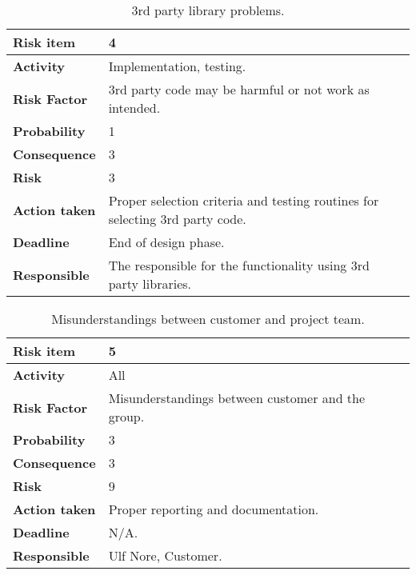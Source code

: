 \begin{table}[h!]
\begin{center}
\begin{tabularx}{\textwidth}{| X | X |}
\hline
\textbf{Risk item} & 4 \\
\hline
\textbf{Activity} & Implementation, testing.  \\
\hline
\textbf{Risk Factor} & 3rd party code may be harmful or not work as intended. \\
\hline
\textbf{Probability} & 1 \\
\hline
\textbf{Consequence} & 3 \\
\hline
\textbf{Risk} & 3 \\
\hline
\textbf{Action taken} & Proper selection criteria and testing routines for selecting 3rd party code. \\
\hline
\textbf{Deadline} & End of design phase. \\
\hline
\textbf{Responsible} & The responsible for the functionality using 3rd party libraries. \\
\hline
\end{tabularx}
\caption{3rd party library problems.}
\end{center}
\label{risk_7}
\end{table}


\begin{table}[h!]

\begin{center}
\begin{tabularx}{\textwidth}{| X | X |}
\hline
\textbf{Risk item} & 5 \\
\hline
\textbf{Activity} & All  \\
\hline
\textbf{Risk Factor} & Misunderstandings between customer and the group. \\
\hline
\textbf{Probability} & 3 \\
\hline
\textbf{Consequence} & 3 \\
\hline
\textbf{Risk} & 9 \\
\hline
\textbf{Action taken} & Proper reporting and documentation. \\
\hline
\textbf{Deadline} & N/A. \\
\hline
\textbf{Responsible} & Ulf Nore, Customer. \\
\hline
\end{tabularx}
\caption{Misunderstandings between customer and project team.}
\end{center}
\label{risk_8}
\end{table}



